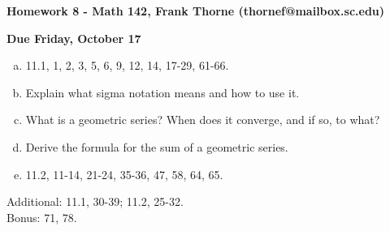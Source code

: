\documentclass[12pt]{article}
\begin{document}
\setlength{\topmargin}{-2mm}





\begin{center}{\bf Homework 8 - Math 142, Frank Thorne (thornef@mailbox.sc.edu)}
\end{center}
\begin{center}
{\bf Due Friday, October 17}
\end{center}

\begin{enumerate}[(a)]
\item
11.1, 1, 2, 3, 5, 6, 9, 12, 14, 17-29, 61-66.
\item
Explain what sigma notation means and how to use it.

\item
What is a geometric series? When does it converge, and if so, to what?

\item
Derive the formula for the sum of a geometric series.

\item
11.2, 11-14, 21-24, 35-36, 47, 58, 64, 65.

\end{enumerate}
Additional: 11.1, 30-39; 11.2, 25-32.
\\
Bonus: 71, 78.
\end{document}
